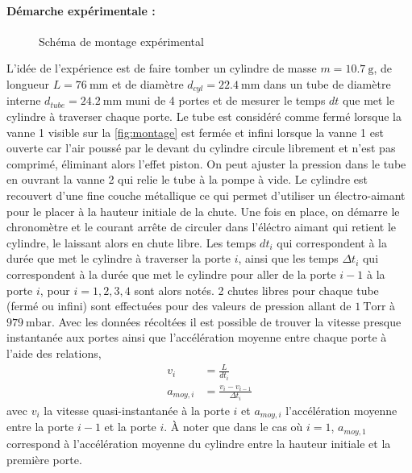 \documentclass[a4paper, 12pt,oneside]{article}
\begin{document}
\paragraph{Démarche expérimentale : } 
\begin{figure} %
    \centering
    \caption{ Schéma de montage expérimental \cite{notice} }
    \label{fig:montage}
\end{figure}
L'idée de l'expérience est de faire tomber un cylindre de masse $m = 10.7~\mathrm{g}$, de longueur $L = 76~\mathrm{mm}$ et de diamètre $d_{cyl} = 22.4~\mathrm{mm}$ dans un tube de diamètre interne $d_{tube} = 24.2~\mathrm{mm}$ muni de 4 portes et de mesurer le temps $dt$ que met le cylindre à traverser chaque       porte. Le tube est considéré comme fermé lorsque la vanne 1 visible sur la \autoref{fig:montage} est fermée et infini lorsque la vanne 1 est ouverte car l'air poussé par le devant du cylindre circule librement et n'est pas comprimé, éliminant alors l'effet piston. On peut ajuster la pression dans le tube en ouvrant la vanne 2 qui relie le tube à la pompe à vide. Le cylindre est recouvert d'une fine couche métallique ce qui permet d'utiliser un électro-aimant pour le placer à la hauteur initiale de la chute. Une fois en place, on démarre le chronomètre et le courant arrête de circuler dans l'éléctro aimant qui retient le cylindre, le laissant alors en chute libre. Les temps $dt_i$ qui correspondent à la durée que met le cylindre à traverser la porte $i$, ainsi que les temps $\Delta t_i$ qui correspondent à la durée que met le cylindre pour aller de la porte  $i-1$ à la porte $i$, pour $i = 1, 2, 3, 4$ sont alors notés. 2 chutes libres pour chaque tube (fermé ou infini) sont effectuées pour des valeurs de pression allant de $1~\mathrm{Torr}$ à $979~\mathrm{mbar}$. Avec les données récoltées il est possible de trouver la vitesse  presque instantanée aux portes ainsi que l'accélération moyenne entre chaque porte à l'aide des relations, 
\begin{align}
    v_i &= \frac{L}{dt_i} \label{eq:v_inst} \\
    a_{moy,i} &= \frac{v_i - v_{i-1}}{\Delta t_i} \label{eq:a_moy}
\end{align}
\cite{notice} avec $v_i$ la vitesse quasi-instantanée à la porte $i$ et $a_{moy,i}$ l'accélération moyenne entre la porte $i-1$ et la porte $i$. À noter que dans le cas où $i = 1$, $a_{moy,1}$ correspond à l'accélération moyenne du cylindre entre la hauteur initiale et la première porte. 
\end{document}
